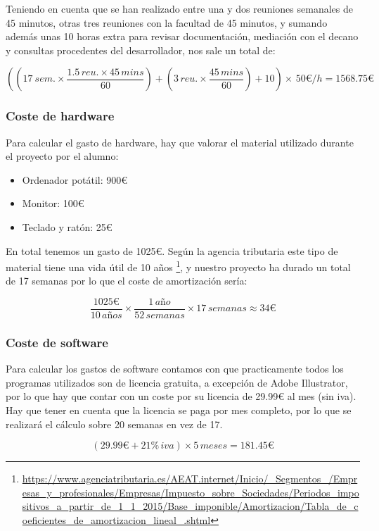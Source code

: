 Teniendo en cuenta que se han realizado entre una y dos reuniones semanales de 45 minutos, otras tres reuniones con la facultad de 45 minutos, y sumando además unas 10 horas extra para revisar documentación, mediación con el decano y consultas procedentes del desarrollador, nos sale un total de:

\[ \left (  \left ( 17\: sem. \times \frac{1.5\, reu.\times 45\, mins}{60} \right )+\left ( 3\, reu. \times \frac{45\, mins}{60} \right ) + 10\right )\times\, 50\euro/h = 1568.75\euro \]


\subsubsection{Coste de hardware}

Para calcular el gasto de hardware, hay que valorar el material utilizado durante el proyecto por el alumno:
\begin{itemize}
	\item Ordenador potátil: 900€
	\item Monitor: 100€
	\item Teclado y ratón: 25€
\end{itemize}

En total tenemos un gasto de 1025€. Según la agencia tributaria este tipo de material tiene una vida útil de 10 años \footnote{\url{https://www.agenciatributaria.es/AEAT.internet/Inicio/_Segmentos_/Empresas_y_profesionales/Empresas/Impuesto_sobre_Sociedades/Periodos_impositivos_a_partir_de_1_1_2015/Base_imponible/Amortizacion/Tabla_de_coeficientes_de_amortizacion_lineal_.shtml}}, y nuestro proyecto ha durado un total de 17 semanas por lo que el coste de amortización sería:

\[\frac{1025\euro}{10\, a\textit{ñ}os} \times \frac{1\, a\textit{ñ}o}{52\, semanas} \times 17\, semanas \approx  34\euro \]

\subsubsection{Coste de software}

Para calcular los gastos de software contamos con que practicamente todos los programas utilizados son de licencia gratuita, a excepción de Adobe Illustrator, por lo que hay que contar con un coste por su licencia de 29.99€ al mes (sin iva). Hay que tener en cuenta que la licencia se paga por mes completo, por lo que se realizará el cálculo sobre 20 semanas en vez de 17.

\[ (29.99 \euro + 21\% \, iva) \times 5\, meses = 181.45 \euro\]

